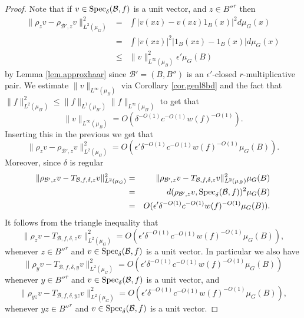 \documentclass[12pt]{amsart}
\numberwithin{equation}{section}
\theoremstyle{plain}
\theoremstyle{definition}
\renewcommand{\leq}{\leqslant}
\providecommand{\Spec}{\mathop{\rm Spec}\nolimits}
\begin{document}
\begin{proof}
Note that if $v \in \Spec_{\delta}(\mathcal{B},f)$ is a unit vector, and $z \in B''^r$ then
\begin{eqnarray*}
 \|\rho_zv - \rho_{\mathcal{B}',z}v\|_{L^2(\mu_G)}^2& =& \int{|v(xz) - v(xz)1_B(x)|^2d\mu_G(x)}\\  & = & \int{|v(xz)|^2|1_{B}(xz) - 1_B(x)|d\mu_G(x)}\\ & \leq & \|v\|_{L^\infty(\mu_B)}^2\epsilon'\mu_G(B)
\end{eqnarray*}
by Lemma \ref{lem.approxhaar} since $\mathcal{B}'=(B,B'')$ is an $\epsilon'$-closed $r$-multiplicative pair. We estimate $\|v\|_{L^\infty(\mu_B)}$ via Corollary \ref{cor.genl8bd} and the fact that $\|f\|_{L^2(\mu_{B'})}^2 \leq \|f\|_{L^1(\mu_{B'})}\|f\|_{L^\infty(\mu_{B'})}$ to get that
\begin{equation*}
\|v\|_{L^\infty(\mu_B)} =O( \delta^{-O(1)}c^{-O(1)}w(f)^{-O(1)}).
\end{equation*}
Inserting this in the previous we get that
\begin{equation*}
\|\rho_zv - \rho_{\mathcal{B}',z}v\|_{L^2(\mu_G)}^2=O(\epsilon'\delta^{-O(1)}c^{-O(1)}w(f)^{-O(1)}\mu_G(B)).
\end{equation*}
Moreover, since $\delta$ is regular
\begin{eqnarray*}
\|\rho_{\mathcal{B}',z}v - T_{\mathcal{B},f,\delta,z}v\|_{L^2(\mu_G)}^2 & = & \|\rho_{\mathcal{B}',z}v - T_{\mathcal{B},f,\delta,z}v\|_{L^2(\mu_B)}^2\mu_G(B)\\ & = & d(\rho_{\mathcal{B}',z}v,\Spec_{\delta}(\mathcal{B},f))^2\mu_G(B)\\ & = & O(\epsilon'\delta^{-O(1)}c^{-O(1)}w(f)^{-O(1)}\mu_G(B)).
\end{eqnarray*}
It follows from the triangle inequality that
\begin{equation}\label{eqn.apx}
\|\rho_zv - T_{\mathcal{B},f,\delta,z}v\|_{L^2(\mu_G)}^2 =O(\epsilon'\delta^{-O(1)}c^{-O(1)}w(f)^{-O(1)}\mu_G(B)),
\end{equation}
whenever $z \in B''^r$ and $v \in \Spec_\delta(\mathcal{B},f)$ is a unit vector.  In particular we also have
\begin{equation}\label{eqn.apx2}
\|\rho_yv - T_{\mathcal{B},f,\delta,y}v\|_{L^2(\mu_G)}^2 =O(\epsilon'\delta^{-O(1)}c^{-O(1)}w(f)^{-O(1)}\mu_G(B))
\end{equation}
whenever $y \in B''^r$ and $v \in \Spec_\delta(\mathcal{B},f)$ is a unit vector, and
\begin{equation}\label{eqn.apx3}
\|\rho_{yz}v - T_{\mathcal{B},f,\delta,yz}v\|_{L^2(\mu_G)}^2 =O(\epsilon'\delta^{-O(1)}c^{-O(1)}w(f)^{-O(1)}\mu_G(B)),
\end{equation}
whenever $yz \in B''^r$ and $v \in \Spec_\delta(\mathcal{B},f)$ is a unit vector.


\end{proof}
\end{document}
